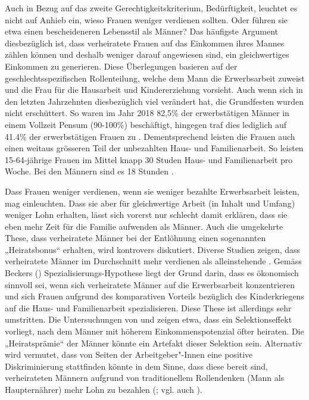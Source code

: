 \documentclass[a4paper,12pt]{article}
\renewcommand{\baselinestretch}{1.1}
\newif\ifcomments
\newcommand{\comment}[1]{%
    \ifcomments\marginpar{\renewcommand{\baselinestretch}{1}\tiny\hspace*{-1.1em}\colorbox{gray!20}%
    {\textcolor{red}{\parbox[t]{.9in}{\raggedright #1}}}}\fi}
\begin{document}
Auch in Bezug auf das zweite Gerechtigkeitskriterium, Bedürftigkeit, leuchtet
es nicht auf Anhieb ein, wieso Frauen weniger verdienen sollten. Oder führen
sie etwa einen bescheideneren Lebensstil als Männer? Das häufigste Argument
diesbezüglich ist, dass verheiratete Frauen auf das Einkommen ihres Mannes
zählen können und deshalb weniger darauf angewiesen sind, ein gleichwertiges
Einkommen zu generieren. Diese Überlegungen basieren auf der
geschlechtsspezifischen Rollenteilung, welche dem Mann die Erwerbsarbeit
zuweist und die Frau für die Hausarbeit und Kindererziehung vorsieht. Auch wenn
sich in den letzten Jahrzehnten diesbezüglich viel verändert hat, die
Grundfesten wurden nicht erschüttert. So waren im Jahr 2018 82,5\% der erwerbstätigen Männer in einem Vollzeit Pensum (90-100\%) beschäftigt, hingegen traf dies lediglich auf 41.4\% der erwerbstätigen Frauen zu \citep{BFS-2019d}.
Dementsprechend leisten die Frauen auch einen weitaus grösseren Teil der unbezahlten Haus- und Familienarbeit. So leisten 15-64-jährige Frauen im Mittel knapp 30 Studen Haus- und Familienarbeit pro Woche. Bei den Männern sind es 18 Stunden \citep{BFS-2017}. \comment{Hier evtl. etwas ergänzen.-> Habe ein paar Zahlen und Erläuterungen ergänzt}
Dass Frauen weniger verdienen, wenn sie weniger bezahlte Erwerbsarbeit leisten, mag einleuchten. Dass sie aber für gleichwertige Arbeit (in Inhalt und Umfang) weniger Lohn erhalten, lässt sich vorerst nur schlecht damit erklären, dass sie eben mehr Zeit für die Familie aufwenden als Männer. Auch die umgekehrte These, dass verheiratete Männer bei der Entlöhnung einen sogenannten „Heiratsbonus“ erhalten, wird kontrovers diskutiert. \comment{die folgenden beiden Abschnitte sind aus dem Kapitel von Exp. 3 ausgeschnitten und verschoben worden.} Diverse Studien zeigen, dass verheiratete Männer im Durchschnitt mehr verdienen als alleinstehende
\citep{Budig-Lim-2016,Killewald-Gough-2013}. Gemäss Beckers
(\citeyear{Becker-1981}) Spezialisierungs-Hypothese liegt der Grund darin, dass
es ökonomisch sinnvoll sei, wenn sich verheiratete Männer auf die Erwerbsarbeit
konzentrieren und sich Frauen aufgrund des komparativen Vorteils bezüglich des
Kinderkriegens auf die Haus- und Familienarbeit spezialisieren. Diese These ist
allerdings sehr umstritten. Die Untersuchungen von \citet{Ludwig-Bruederl-2011}
und \citet{Jakobsson-Kotsadam-2016} zeigen etwa, dass ein Selektionseffekt
vorliegt, nach dem Männer mit höherem Einkommenspotenzial öfter heiraten. Die
„Heiratsprämie“ der Männer könnte ein Artefakt dieser Selektion sein.
Alternativ wird vermutet, dass von Seiten der Arbeitgeber"-Innen eine positive
Diskriminierung stattfinden könnte in dem Sinne, dass diese bereit sind,
verheirateten Männern aufgrund von traditionellem Rollendenken (Mann
als Haupternährer) mehr Lohn zu bezahlen (\citealp{Budig-Lim-2016}; vgl. auch
\citealp{Killewald-Gough-2013}).
\end{document}

